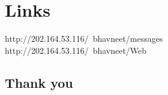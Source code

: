 \section{Links}
 http://202.164.53.116/~bhavneet/messages
\newline
http://202.164.53.116/~bhavneet/Web
\newpage
\begin{center}

\section*{Thank you}
\end{center}


